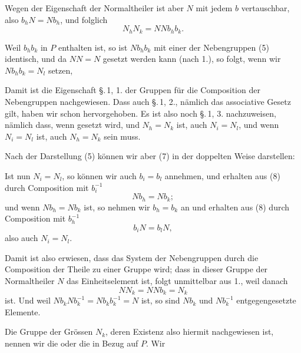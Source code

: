 

Wegen der Eigenschaft der Normaltheiler ist aber $N$ mit jedem $b$ vertauschbar, also $b_h N = N b_h$, und folglich
\[
N_h N_k = N N b_h b_k.
\]

Weil $b_h b_k$ in $P$ enthalten ist, so ist $N b_h b_k$ mit einer der Nebengruppen (5) identisch, und da $NN = N$ gesetzt werden kann (nach 1.), so folgt, wenn wir $N b_h b_k = N_l$ setzen,

Damit ist die Eigenschaft \S.\,1, 1. der Gruppen für die Composition der Nebengruppen nachgewiesen. Dass auch \S.\,1, 2., nämlich das associative Gesetz gilt, haben wir schon hervorgehoben. Es ist also noch \S.\,1, 3. nachzuweisen, nämlich dass, wenn
gesetzt wird, und $N_h = N_k$ ist, auch $N_i = N_l$, und wenn $N_i = N_l$ ist, auch $N_h = N_k$ sein muss.

Nach der Darstellung (5) können wir aber (7) in der doppelten Weise darstellen:

Ist nun $N_i = N_l$, so können wir auch $b_i = b_l$ annehmen, und erhalten aus (8) durch Composition mit $b_i^{-1}$
\[
N b_h = N b_k;
\]
und wenn $N b_h = N b_k$ ist, so nehmen wir $b_h = b_k$ an und erhalten aus (8) durch Composition mit $b_h^{-1}$
\[
b_i N = b_l N,
\]
also auch $N_i = N_l$.

Damit ist also erwiesen, dass das System der Nebengruppen durch die Composition der Theile zu einer Gruppe wird; dass in dieser Gruppe der Normaltheiler $N$ das Einheitselement ist, folgt unmittelbar aus 1., weil danach
\[
N N_k = N N b_k = N_k
\]
ist. Und weil $N b_k N b_k^{-1} = N b_k b_k^{-1} = N$ ist, so sind $N b_k$ und $N b_k^{-1}$ entgegengesetzte Elemente.

Die Gruppe der Grössen $N_k$, deren Existenz also hiermit nachgewiesen ist, nennen wir die  oder die  in Bezug auf $P$. Wir
